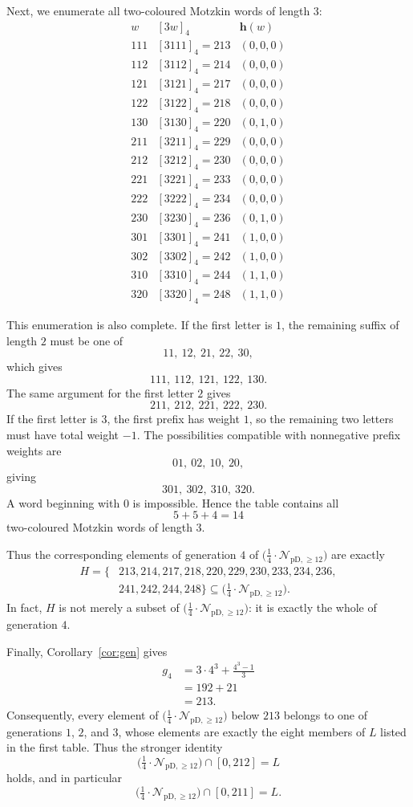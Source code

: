 \documentclass[12pt]{article}
\theoremstyle{plain}
\theoremstyle{definition}
\theoremstyle{plain}
\newcommand{\Pset}{%
  \bigl(\tfrac{1}{4}\cdot\mathcal{N}_{\mathrm{pD},\geq 12}\bigr)%
}
\begin{document}
Next, we enumerate all two-coloured Motzkin words of length $3$:
\[
\begin{array}{c|c|c}
 w&[3w]_4&\mathbf h(w)\\ \hline
111 &[3111]_4=213&(0,0,0)\\
112 &[3112]_4=214&(0,0,0)\\
121 &[3121]_4=217&(0,0,0)\\
122 &[3122]_4=218&(0,0,0)\\
130 &[3130]_4=220&(0,1,0)\\ \hline
211 &[3211]_4=229&(0,0,0)\\
212 &[3212]_4=230&(0,0,0)\\
221 &[3221]_4=233&(0,0,0)\\
222 &[3222]_4=234&(0,0,0)\\
230 &[3230]_4=236&(0,1,0)\\ \hline
301 &[3301]_4=241&(1,0,0)\\
302 &[3302]_4=242&(1,0,0)\\
310 &[3310]_4=244&(1,1,0)\\
320 &[3320]_4=248&(1,1,0)
\end{array}
\]

This enumeration is also complete.  If the first letter is $1$, the
remaining suffix of length $2$ must be one of
\[
 11,\ 12,\ 21,\ 22,\ 30,
\]
which gives
\[
 111,\ 112,\ 121,\ 122,\ 130.
\]
The same argument for the first letter $2$ gives
\[
 211,\ 212,\ 221,\ 222,\ 230.
\]
If the first letter is $3$, the first prefix has weight $1$, so the
remaining two letters must have total weight $-1$.  The possibilities
compatible with nonnegative prefix weights are
\[
 01,\ 02,\ 10,\ 20,
\]
giving
\[
 301,\ 302,\ 310,\ 320.
\]
A word beginning with $0$ is impossible.  Hence the table contains all
\[
 5+5+4=14
\]
two-coloured Motzkin words of length $3$.

Thus the corresponding elements of generation $4$ of $\Pset$ are exactly
\begin{equation}\label{eq:H-def}
\begin{split}
 H=\{&213,214,217,218,220,229,230,233,234,236,\\
     &241,242,244,248\}
 \subseteq\Pset.
\end{split}
\end{equation}
In fact, $H$ is not merely a subset of $\Pset$: it is exactly the whole of
generation $4$.

Finally, Corollary~\ref{cor:gen} gives
\[
\begin{aligned}
 g_4
 &=3\cdot4^3+\frac{4^3-1}{3}\\
 &=192+21\\
 &=213.
\end{aligned}
\]
Consequently, every element of $\Pset$ below $213$ belongs to one of
generations $1$, $2$, and $3$, whose elements are exactly the eight
members of $L$ listed in the first table.  Thus the stronger identity
\[
 \Pset\cap[0,212]=L
\]
holds, and in particular
\begin{equation}\label{eq:P-small}
 \Pset\cap[0,211]=L.
\end{equation}
\end{document}
